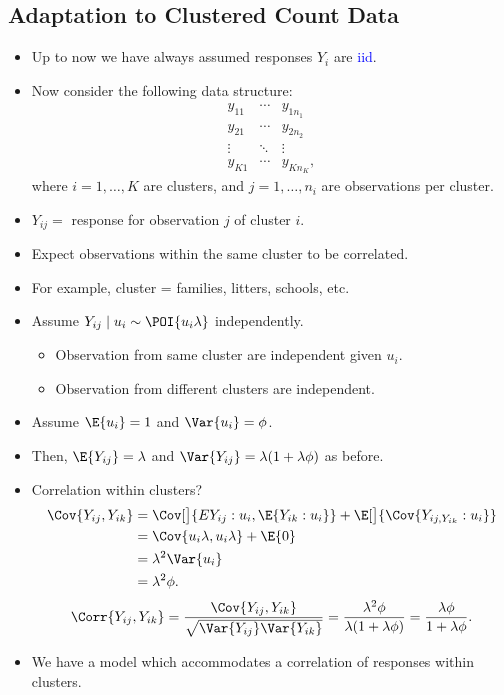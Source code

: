 \documentclass[oneside]{book}\usepackage[]{graphicx}\usepackage[svgnames]{xcolor}
\providecommand\given{} %
\renewcommand\given{\nonscript\:\delimsize\vert\nonscript\:\mathopen{}}%
\renewcommand\given{\nonscript\:\delimsize\vert\nonscript\:\mathopen{}}%
\renewcommand\given{\nonscript\:\delimsize\vert\nonscript\:\mathopen{}}%
\renewcommand\given{\nonscript\:\delimsize\vert\nonscript\:\mathopen{}}%
\renewcommand\given{\nonscript\:\delimsize\vert\nonscript\:\mathopen{}}%
\renewcommand\given{\nonscript\:\delimsize\vert\nonscript\:\mathopen{}}%
\renewcommand\given{\nonscript\:\delimsize\vert\nonscript\:\mathopen{}}%
\renewcommand\given{\nonscript\:\delimsize\vert\nonscript\:\mathopen{}}%
\renewcommand\given{\nonscript\:\delimsize\vert\nonscript\:\mathopen{}}%
\renewcommand\given{\nonscript\:\delimsize\vert\nonscript\:\mathopen{}}%
\renewcommand\given{\nonscript\:\delimsize\vert\nonscript\:\mathopen{}}%
\renewcommand\given{\nonscript\:\delimsize\vert\nonscript\:\mathopen{}}%
\renewcommand\given{:}
\begin{document}
\subsection*{Adaptation to Clustered Count Data}
\begin{itemize}
      \item Up to now we have always assumed responses $ Y_i $ are \textcolor{Blue}{iid}.
      \item Now consider the following data structure:
            \[ \begin{matrix}
                        y_{11} & \cdots & y_{1n_1}   \\
                        y_{21} & \cdots & y_{2n_2}   \\
                        \vdots & \ddots & \vdots     \\
                        y_{K1} & \cdots & y_{K n_K},
                  \end{matrix} \]
            where $ i=1,\ldots,K $ are clusters, and $ j=1,\ldots,n_i $ are observations per cluster.
      \item $ Y_{ij}= $ response for observation $ j $ of cluster $ i $.
      \item Expect observations within the same cluster to be correlated.
      \item For example, cluster = families, litters, schools, etc.
      \item Assume $ Y_{ij}\mid u_i \sim \POI{u_i\lambda} $ independently.
            \begin{itemize}
                  \item Observation from same cluster are independent given $ u_i $.
                  \item Observation from different clusters are independent.
            \end{itemize}
      \item Assume $ \E{u_i}=1 $ and $ \Var{u_i}=\phi $.
      \item Then, $ \E{Y_{ij}}=\lambda $ and $ \Var{Y_{ij}}=\lambda(1+\lambda\phi) $ as before.
      \item Correlation within clusters?
            \begin{align*}
                  \Cov{Y_{ij},Y_{ik}}
                   & =\Cov[\big]{ E{Y_{ij}\given u_i},\E{Y_{ik}\given u_i} } + \E[\big]{\Cov{Y_{ij,Y_{ik}}\given u_i}} \\
                   & =\Cov{u_i\lambda,u_i\lambda}+\E{0}                                                                \\
                   & =\lambda^2\Var{u_i}                                                                               \\
                   & =\lambda^2\phi.
            \end{align*}
            \[ \Corr{Y_{ij},Y_{ik}}=\frac{\Cov{Y_{ij},Y_{ik}}}{\sqrt{\Var{Y_{ij}}\Var{Y_{ik}} }}=\frac{\lambda^2\phi}{\lambda(1+\lambda\phi)}=\frac{\lambda\phi}{1+\lambda\phi}. \]
      \item We have a model which accommodates a correlation of responses within clusters.
\end{itemize}
\end{document}
